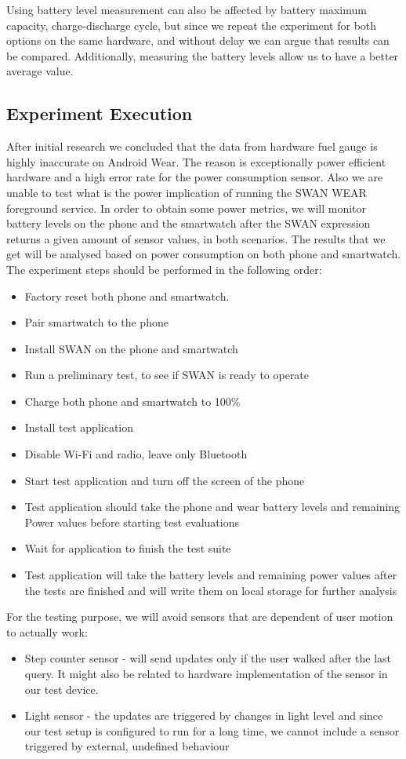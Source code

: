  Using battery level measurement can also be affected by battery maximum capacity, charge-discharge cycle, but since we repeat the experiment for both options on the same hardware, and without delay we can argue that results can be compared.
 Additionally, measuring the battery levels allow us to have a better average value.
 
 \subsection{Experiment Execution}
 After initial research we concluded that the data from hardware fuel gauge is highly inaccurate on Android Wear.
 The reason is exceptionally power efficient hardware and a high error rate for the power consumption sensor. 
 Also we are unable to test what is the power implication of running the SWAN WEAR foreground service. 
 In order to obtain some power metrics, we will monitor battery levels on the phone and the smartwatch after the SWAN expression returns a given amount of sensor values, in both scenarios.
The results that we get will be analysed based on power consumption on both phone and smartwatch.
The experiment steps should be performed in the following order:
\begin{itemize}
 \item Factory reset both phone and smartwatch.
 \item Pair smartwatch to the phone
 \item Install SWAN on the phone and smartwatch
 \item Run a preliminary test, to see if SWAN is ready to operate
 \item Charge both phone and smartwatch to 100\%
 \item Install test application
 \item Disable Wi-Fi and radio, leave only Bluetooth
 \item Start test application and turn off the screen of the phone
 \item Test application should take the phone and wear battery levels and remaining Power values before starting test evaluations
 \item Wait for application to finish the test suite
 \item Test application will take the battery levels and remaining power values after the tests are finished and will write them on local storage for further analysis
\end{itemize}

For the testing purpose, we will avoid sensors that are dependent of user motion to actually work: 
\begin{itemize}
 \item Step counter sensor - will send updates only if the user walked after the last query. It might also be related to hardware implementation of the sensor in our test device\cite{motorolla_stepcounter}. 
 \item Light sensor - the updates are triggered by changes in light level and since our test setup is configured to run for a long time, we cannot include a sensor triggered by external,
 undefined behaviour
\end{itemize}

